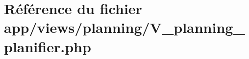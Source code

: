 \hypertarget{_v__planning__planifier_8php}{}\section{Référence du fichier app/views/planning/\+V\+\_\+planning\+\_\+planifier.php}
\label{_v__planning__planifier_8php}
